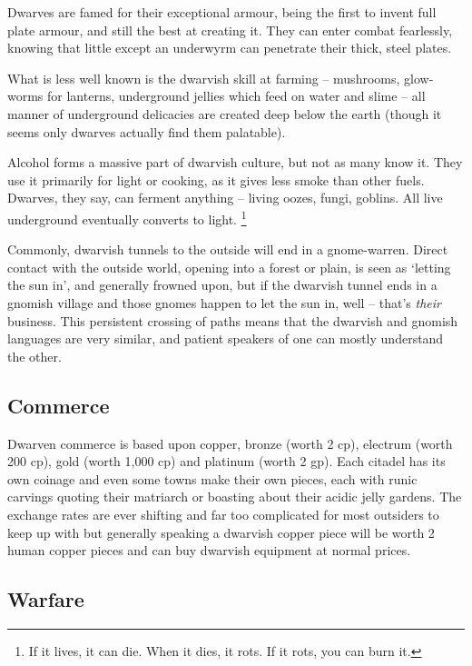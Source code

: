 \begin{multicols}{2}
Dwarves are famed for their exceptional armour, being the first to invent full plate armour, and still the best at creating it. They can enter combat fearlessly, knowing that little except an underwyrm can penetrate their thick, steel plates.

What is less well known is the dwarvish skill at farming -- mushrooms, glow-worms for lanterns, underground jellies which feed on water and slime -- all manner of underground delicacies are created deep below the earth (though it seems only dwarves actually find them palatable).

Alcohol forms a massive part of dwarvish culture, but not as many know it.
They use it primarily for light or cooking, as it gives less smoke than other fuels.
Dwarves, they say, can ferment anything -- living oozes, fungi, goblins.
All live underground eventually converts to light.%
\footnote{If it lives, it can die. When it dies, it rots. If it rots, you can burn it.}

Commonly, dwarvish tunnels to the outside will end in a gnome-warren.
Direct contact with the outside world, opening into a forest or plain, is seen as `letting the sun in',
and generally frowned upon, but if the dwarvish tunnel ends in a gnomish village and those gnomes happen to let the sun in, well -- that's \emph{their} business.
This persistent crossing of paths means that the dwarvish and gnomish languages are very similar, and patient speakers of one can mostly understand the other.

\subsection{Commerce}

Dwarven commerce is based upon copper, bronze (worth 2 cp), electrum (worth 200 cp), gold (worth 1,000 cp) and platinum (worth 2 gp).
Each citadel has its own coinage and even some towns make their own pieces, each with runic carvings quoting their matriarch or boasting about their acidic jelly gardens.
The exchange rates are ever shifting and far too complicated for most outsiders to keep up with but generally speaking a dwarvish copper piece will be worth 2 human copper pieces and can buy dwarvish equipment at normal prices.

\subsection{Warfare}


\end{multicols}
